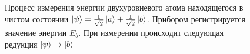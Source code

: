 \begin{figure}
\centering



\caption{Процесс измерения энергии двухуровневого атома находящегося в
чистом состоянии $\left|\psi\right> = 
\frac{1}{\sqrt{2}}\ket{a} + \frac{1}{\sqrt{2}}\ket{b}$.
Прибором регистрируется значение энергии $E_b$. При измерении
происходит следующая редукция $\left|\psi\right> \to \ket{b}$
}
\label{fig:add:mesure_ex_b}
\end{figure}
